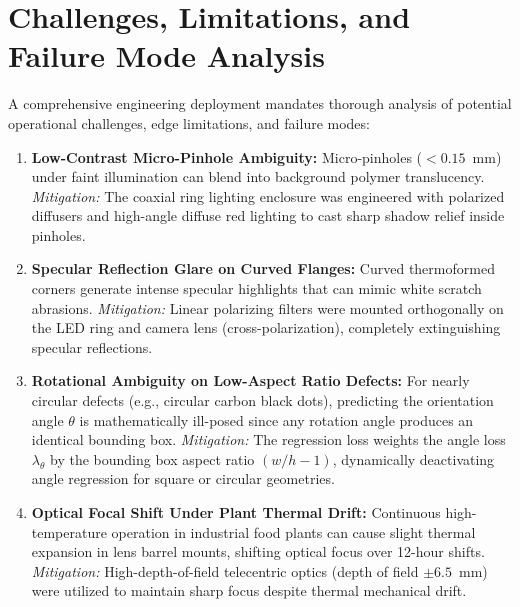 \section{Challenges, Limitations, and Failure Mode Analysis}
\label{sec:challenges}

A comprehensive engineering deployment mandates thorough analysis of potential operational challenges, edge limitations, and failure modes:

\begin{enumerate}
\item \textbf{Low-Contrast Micro-Pinhole Ambiguity:} Micro-pinholes ($<0.15$~mm) under faint illumination can blend into background polymer translucency. \emph{Mitigation:} The coaxial ring lighting enclosure was engineered with polarized diffusers and high-angle diffuse red lighting to cast sharp shadow relief inside pinholes.
\item \textbf{Specular Reflection Glare on Curved Flanges:} Curved thermoformed corners generate intense specular highlights that can mimic white scratch abrasions. \emph{Mitigation:} Linear polarizing filters were mounted orthogonally on the LED ring and camera lens (cross-polarization), completely extinguishing specular reflections.
\item \textbf{Rotational Ambiguity on Low-Aspect Ratio Defects:} For nearly circular defects (e.g., circular carbon black dots), predicting the orientation angle $\theta$ is mathematically ill-posed since any rotation angle produces an identical bounding box. \emph{Mitigation:} The regression loss weights the angle loss $\lambda_{\theta}$ by the bounding box aspect ratio $(w/h - 1)$, dynamically deactivating angle regression for square or circular geometries.
\item \textbf{Optical Focal Shift Under Plant Thermal Drift:} Continuous high-temperature operation in industrial food plants can cause slight thermal expansion in lens barrel mounts, shifting optical focus over 12-hour shifts. \emph{Mitigation:} High-depth-of-field telecentric optics (depth of field $\pm 6.5$~mm) were utilized to maintain sharp focus despite thermal mechanical drift.
\end{enumerate}
